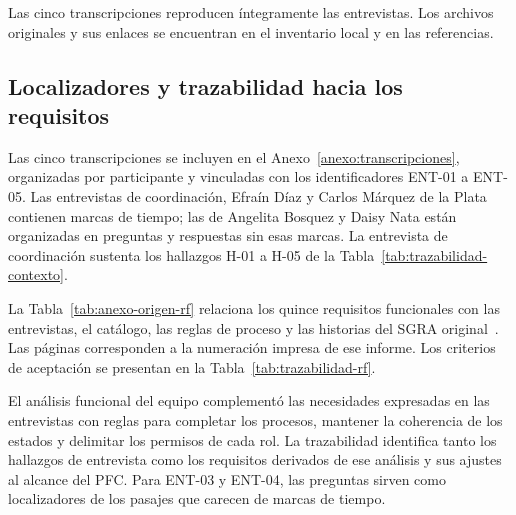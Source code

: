 Las cinco transcripciones reproducen íntegramente las entrevistas. Los archivos originales y sus enlaces se encuentran en el inventario local y en las referencias.

\subsection{Localizadores y trazabilidad hacia los requisitos}

Las cinco transcripciones se incluyen en el Anexo~\ref{anexo:transcripciones}, organizadas por participante y vinculadas con los identificadores ENT-01 a ENT-05. Las entrevistas de coordinación, Efraín Díaz y Carlos Márquez de la Plata contienen marcas de tiempo; las de Angelita Bosquez y Daisy Nata están organizadas en preguntas y respuestas sin esas marcas. La entrevista de coordinación sustenta los hallazgos H-01 a H-05 de la Tabla~\ref{tab:trazabilidad-contexto}.

La Tabla~\ref{tab:anexo-origen-rf} relaciona los quince requisitos funcionales con las entrevistas, el catálogo, las reglas de proceso y las historias del SGRA original~\cite{SGRA-documentacion-original}. Las páginas corresponden a la numeración impresa de ese informe. Los criterios de aceptación se presentan en la Tabla~\ref{tab:trazabilidad-rf}.

El análisis funcional del equipo complementó las necesidades expresadas en las entrevistas con reglas para completar los procesos, mantener la coherencia de los estados y delimitar los permisos de cada rol. La trazabilidad identifica tanto los hallazgos de entrevista como los requisitos derivados de ese análisis y sus ajustes al alcance del PFC. Para ENT-03 y ENT-04, las preguntas sirven como localizadores de los pasajes que carecen de marcas de tiempo.

